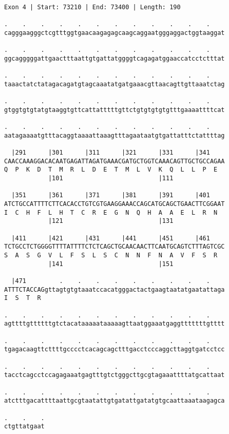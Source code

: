 \documentclass{article}
\begin{document}
\begin{Verbatim}
Exon 4 | Start: 73210 | End: 73400 | Length: 190
 
.    .    .    .    .    .    .    .    .    .    .    .    
cagggaagggctcgtttggtgaacaagagagcaagcaggaatgggaggactggtaaggat
  
.    .    .    .    .    .    .    .    .    .    .    .    
ggcagggggattgaactttaattgtgattatggggtcagagatggaaccatcctctttat
  
.    .    .    .    .    .    .    .    .    .    .    .    
taaactatctatagacagatgtagcaaatatgatgaaacgttaacagttgttaaatctag
  
.    .    .    .    .    .    .    .    .    .    .    .    
gtggtgtgtatgtaaggtgttcattatttttgttctgtgtgtgtgtttgaaaattttcat
  
.    .    .    .    .    .    .    .    .    .    .    .    
aatagaaaatgtttacaggtaaaattaaagtttagaataatgtgattatttctattttag
  
  |291      |301      |311      |321      |331      |341    
CAACCAAAGGACACAATGAGATTAGATGAAACGATGCTGGTCAAACAGTTGCTGCCAGAA
Q  P  K  D  T  M  R  L  D  E  T  M  L  V  K  Q  L  L  P  E  
            |101                          |111              
  
  |351      |361      |371      |381      |391      |401    
ATCTGCCATTTTCTTCACACCTGTCGTGAAGGAAACCAGCATGCAGCTGAACTTCGGAAT
I  C  H  F  L  H  T  C  R  E  G  N  Q  H  A  A  E  L  R  N  
            |121                          |131              
  
  |411      |421      |431      |441      |451      |461    
TCTGCCTCTGGGGTTTTATTTTCTCTCAGCTGCAACAACTTCAATGCAGTCTTTAGTCGC
S  A  S  G  V  L  F  S  L  S  C  N  N  F  N  A  V  F  S  R  
            |141                          |151              
  
  |471         .    .    .    .    .    .    .    .    .    
ATTTCTACCAGgttagtgtgtaaatccacatgggactactgaagtaatatgaatattaga
I  S  T  R                                                  
  
.    .    .    .    .    .    .    .    .    .    .    .    
agttttgttttttgtctacataaaaataaaaagttaatggaaatgaggtttttttgtttt
  
.    .    .    .    .    .    .    .    .    .    .    .    
tgagacaagttcttttgcccctcacagcagctttgacctcccaggcttaggtgatcctcc
  
.    .    .    .    .    .    .    .    .    .    .    .    
tacctcagcctccagagaaatgagtttgtctgggcttgcgtagaaattttatgcattaat
  
.    .    .    .    .    .    .    .    .    .    .    .    
atctttgacattttaattgcgtaatattgtgatattgatatgtgcaattaaataagagca
  
.    .    .
ctgttatgaat
\end{Verbatim}
\end{document}
